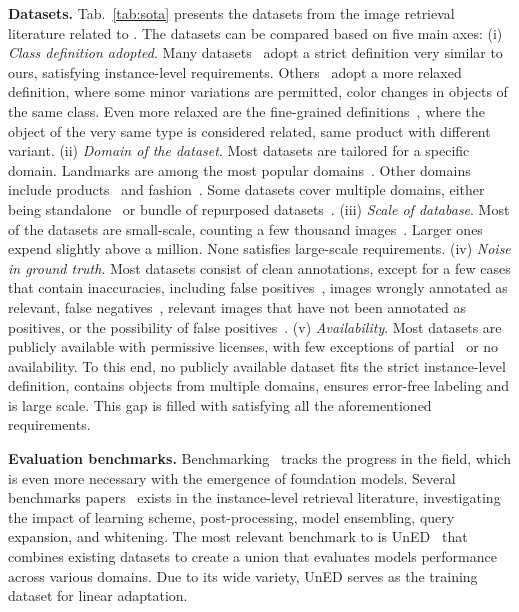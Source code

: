 \noindent\textbf{Datasets. }
Tab.~\ref{tab:sota} presents the datasets from the image retrieval literature related to \ours. The datasets can be compared based on five main axes: (i) \emph{Class definition adopted}. Many datasets~\cite{nister2006scalable,jed+08,rit+18,nas+17,wac+20} adopt a strict definition very similar to ours, satisfying instance-level requirements. Others~\cite{sxj+15,wj15,az11,zwd+21} adopt a more relaxed definition, where some minor variations are permitted, \eg color changes in objects of the same class. Even more relaxed are the fine-grained definitions~\cite{eproduct}, where the object of the very same type is considered related, \eg same product with different variant. (ii) \emph{Domain of the dataset}. Most datasets are tailored for a specific domain. Landmarks are among the most popular domains~\cite{az11,jed+08,rit+18,nas+17,wac+20}. Other domains include products~\cite{nister2006scalable,zwd+21,rp2k} and fashion~\cite{sxj+15,liu2016deepfashion}. Some datasets cover multiple domains, either being standalone~\cite{wj15} or bundle of repurposed datasets~\cite{ycc+23,gpr1200}. (iii) \emph{Scale of database}. Most of the datasets are small-scale, counting a few thousand images~\cite{wj15,liu2016deepfashion,zwd+21}. Larger ones~\cite{rit+18,eproduct,ycc+23} expend slightly above a million. None satisfies large-scale requirements. (iv) \emph{Noise in ground truth}. Most datasets consist of clean annotations, except for a few cases that contain inaccuracies, including false positives~\cite{wac+20}, \ie images wrongly annotated as relevant, false negatives~\cite{nister2006scalable,rit+18}, \ie relevant images that have not been annotated as positives, or the possibility of false positives~\cite{rit+18}. (v) \emph{Availability}. Most datasets are publicly available with permissive licenses, with few exceptions of partial~\cite{az11,jed+08} or no~\cite{eproduct,nas+17} availability.
To this end, no publicly available dataset fits the strict instance-level definition, contains objects from multiple domains, ensures error-free labeling and is large scale. This gap is filled with \ours satisfying all the aforementioned requirements.

\noindent\textbf{Evaluation benchmarks.}
Benchmarking~\cite{sws+00} tracks the progress in the field, which is even more necessary with the emergence of foundation models.
Several benchmarks papers~\cite{zheng2017sift,kmo21,ko2019benchmark} exists in the instance-level retrieval literature, investigating the impact of learning scheme, post-processing, model ensembling, query expansion, and whitening.
The most relevant benchmark to \ours is UnED~\cite{ycc+23} that combines existing datasets to create a union that evaluates models performance across various domains.
Due to its wide variety, UnED serves as the training dataset for linear adaptation. 

